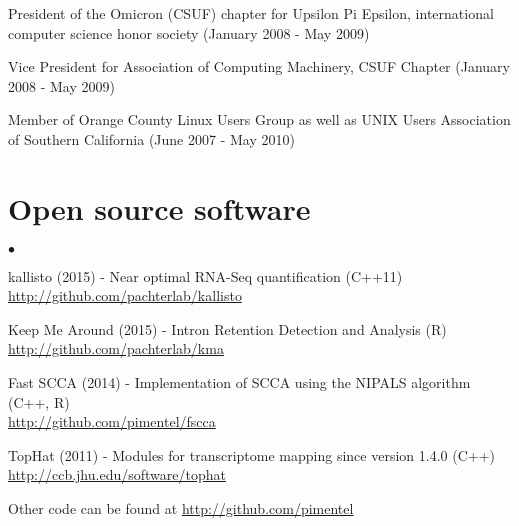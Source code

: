 \documentclass[margin,line]{res}
\newenvironment{list2}{
  \begin{list}{$\bullet$}{%
      \setlength{\itemsep}{0in}
      \setlength{\parsep}{0in} \setlength{\parskip}{0in}
      \setlength{\topsep}{0in} \setlength{\partopsep}{0in}
      \setlength{\leftmargin}{0.2in}}}{\end{list}}
\begin{document}
\begin{resume}
President of the Omicron (CSUF) chapter for Upsilon Pi Epsilon,
international computer science honor society (January 2008 - May 2009)

Vice President for Association of Computing Machinery, CSUF Chapter
(January 2008 - May 2009)

Member of Orange County Linux Users Group as well as UNIX Users
Association of Southern California (June 2007 - May 2010)

\section{\sc Open source software}

\begin{list2}
  \item kallisto (2015) - Near optimal RNA-Seq quantification (C++11)\\
    \url{http://github.com/pachterlab/kallisto}
  \item Keep Me Around (2015) - Intron Retention Detection and Analysis (R) \\
    \url{http://github.com/pachterlab/kma}
  \item Fast SCCA (2014) - Implementation of SCCA using the NIPALS algorithm (C++, R) \\
    \url{http://github.com/pimentel/fscca}
  \item TopHat (2011) - Modules for transcriptome mapping since version 1.4.0 (C++) \\
    \url{http://ccb.jhu.edu/software/tophat}
  \item Other code can be found at \url{http://github.com/pimentel}
\end{list2}


\end{resume}
\end{document}
